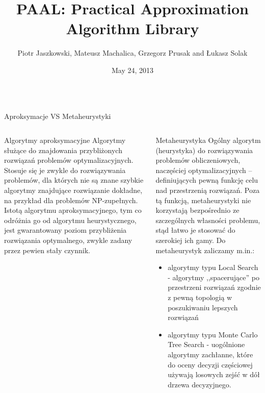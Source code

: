 \documentclass[final,hyperref={pdfpagelabels=false}]{beamer}
\title{\huge PAAL: Practical Approximation Algorithm Library}
\author{Piotr Jaszkowski, Mateusz Machalica, Grzegorz Prusak and Łukasz Solak}
\institute[University of Warsaw]{The Faculty of Mathematics, Informatics and Mechanics, University of Warsaw, Warsaw, Poland}
\date[May 24, 2013]{May 24, 2013}
\begin{document}
\begin{frame}

	\begin{columns}
		\begin{column}{.96\textwidth}
			\vspace{1cm}
			\begin{center}
			\veryHuge Aproksymacje VS Metaheurystyki
			\end{center}
			\vspace{1cm}
		\end{column}
	\end{columns}

	\begin{columns}
		\begin{column}{.46\textwidth}
			\begin{block}{Algorytmy aproksymacyjne}
        Algorytmy służące do znajdowania przybliżonych rozwiązań problemów optymalizacyjnych. Stosuje się je zwykle do rozwiązywania problemów, dla których nie
        są znane szybkie algorytmy znajdujące rozwiązanie dokładne, na przykład dla problemów NP-zupełnych.  Istotą algorytmu aproksymacyjnego, tym co odróżnia
        go od algorytmu heurystycznego, jest gwarantowany poziom przybliżenia rozwiązania optymalnego, zwykle zadany przez pewien stały czynnik.  \vspace{5cm}
			\end{block}
		\end{column}

		\begin{column}{.46\textwidth}
      \begin{block}{Metaheurystyka}
        Ogólny algorytm (heurystyka) do rozwiązywania problemów obliczeniowych, naczęściej optymalizacyjnych -- definiujących pewną funkcję celu nad
        przestrzenią rozwiązań. Poza tą funkcją, metaheurystyki nie korzystają bezpośrednio ze szczególnych własności problemu, stąd łatwo je stosować do
        szerokiej ich gamy. Do metaheurystyk zaliczamy m.in.:
				\begin{itemize}
        \item algorytmy typu Local Search - algorytmy ,,spacerujące'' po przestrzeni rozwiązań zgodnie z pewną topologią w poszukiwaniu lepszych rozwiązań
        \item algorytmy typu Monte Carlo Tree Search - uogólnione algorytmy zachłanne, które do oceny decyzji częściowej używają losowych zejść w dół drzewa
          decyzyjnego.
				\end{itemize}
			\end{block}
		\end{column}
	\end{columns}
	

\end{frame}
\end{document}
